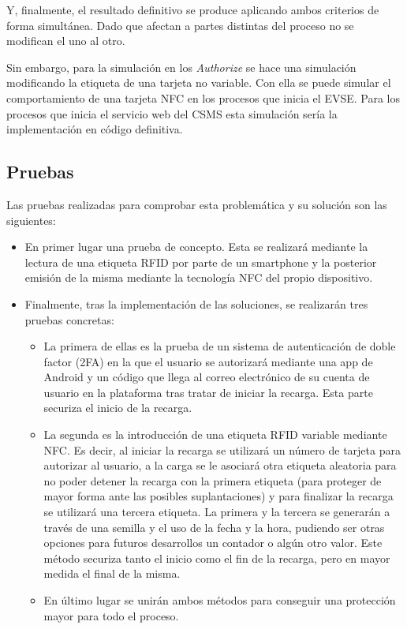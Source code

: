 \documentclass[12pt,a4paper,onecolumn,oneside]{report}
\begin{document}
Y, finalmente, el resultado definitivo se produce aplicando ambos criterios de forma simultánea. Dado que afectan a partes distintas del proceso no se modifican el uno al otro.

Sin embargo, para la simulación en los \textit{Authorize} se hace una simulación modificando la etiqueta de una tarjeta no variable. Con ella se puede simular el comportamiento de una tarjeta NFC en los procesos que inicia el EVSE. Para los procesos que inicia el servicio web del CSMS esta simulación sería la implementación en código definitiva.







\subsection{Pruebas}
\label{Pruebas}

Las pruebas realizadas para comprobar esta problemática y su solución son las siguientes:

\begin{itemize}
\item En primer lugar una prueba de concepto. Esta se realizará mediante la lectura de una etiqueta RFID por parte de un smartphone y la posterior emisión de la misma mediante la tecnología NFC del propio dispositivo.
\item Finalmente, tras la implementación de las soluciones, se realizarán tres pruebas concretas:
\begin{itemize}
\item La primera de ellas es la prueba de un sistema de autenticación de doble factor (2FA) en la que el usuario se autorizará mediante una app de Android y un código que llega al correo electrónico de su cuenta de usuario en la plataforma tras tratar de iniciar la recarga. Esta parte securiza el inicio de la recarga.
\item La segunda es la introducción de una etiqueta RFID variable mediante NFC. Es decir, al iniciar la recarga se utilizará un número de tarjeta para autorizar al usuario, a la carga se le asociará otra etiqueta aleatoria para no poder detener la recarga con la primera etiqueta (para proteger de mayor forma ante las posibles suplantaciones) y para finalizar la recarga se utilizará una tercera etiqueta. La primera y la tercera se generarán a través de una semilla y el uso de la fecha y la hora, pudiendo ser otras opciones para futuros desarrollos un contador o algún otro valor. Este método securiza tanto el inicio como el fin de la recarga, pero en mayor medida el final de la misma.
\item En último lugar se unirán ambos métodos para conseguir una protección mayor para todo el proceso.

\end{itemize}

\end{itemize}
\end{document}
